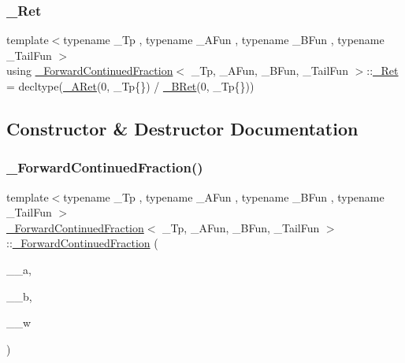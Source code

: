 \mbox{\label{class__ForwardContinuedFraction_ab67bebe1ce3d9ab53ac76024af1b2007}} 
\subsubsection{\texorpdfstring{\+\_\+\+Ret}{\_Ret}}
{\footnotesize\ttfamily template$<$typename \+\_\+\+Tp , typename \+\_\+\+A\+Fun , typename \+\_\+\+B\+Fun , typename \+\_\+\+Tail\+Fun $>$ \\
using \hyperlink{class__ForwardContinuedFraction}{\+\_\+\+Forward\+Continued\+Fraction}$<$ \+\_\+\+Tp, \+\_\+\+A\+Fun, \+\_\+\+B\+Fun, \+\_\+\+Tail\+Fun $>$\+::\hyperlink{class__ForwardContinuedFraction_ab67bebe1ce3d9ab53ac76024af1b2007}{\+\_\+\+Ret} =  decltype(\hyperlink{class__ForwardContinuedFraction_aa3cd354821d01eff12c24f0c4283b6ee}{\+\_\+\+A\+Ret}(0, \+\_\+\+Tp\{\}) / \hyperlink{class__ForwardContinuedFraction_a0353d4790204b04fca698a26fa9a7d0b}{\+\_\+\+B\+Ret}(0, \+\_\+\+Tp\{\}))}



\subsection{Constructor \& Destructor Documentation}
\mbox{\label{class__ForwardContinuedFraction_a0337894d9199abad9dbbfba007cf3dbd}} 
\subsubsection{\texorpdfstring{\+\_\+\+Forward\+Continued\+Fraction()}{\_ForwardContinuedFraction()}}
{\footnotesize\ttfamily template$<$typename \+\_\+\+Tp , typename \+\_\+\+A\+Fun , typename \+\_\+\+B\+Fun , typename \+\_\+\+Tail\+Fun $>$ \\
\hyperlink{class__ForwardContinuedFraction}{\+\_\+\+Forward\+Continued\+Fraction}$<$ \+\_\+\+Tp, \+\_\+\+A\+Fun, \+\_\+\+B\+Fun, \+\_\+\+Tail\+Fun $>$\+::\hyperlink{class__ForwardContinuedFraction}{\+\_\+\+Forward\+Continued\+Fraction} (\begin{DoxyParamCaption}\item[{\+\_\+\+A\+Fun}]{\+\_\+\+\_\+a,  }\item[{\+\_\+\+B\+Fun}]{\+\_\+\+\_\+b,  }\item[{\+\_\+\+Tail\+Fun}]{\+\_\+\+\_\+w }\end{DoxyParamCaption})\hspace{0.3cm}{\ttfamily [inline]}}



